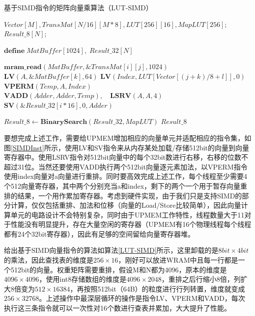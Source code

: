 \begin{algorithm}[!htbp]
    \caption{基于SIMD指令的矩阵向量乘算法（LUT-SIMD）}
    \label{LUT-SIMD}
    \begin{algorithmic}[1]
        \Require $Vector[M], TransMat[N/16][M*8], LUT[256][16], MapLUT[256]$; %
        \Ensure $Result\_8[N]$; %

        \State $\textbf{define}\;MatBuffer[1024],\;Result\_32[N]$

                \State $\textbf{mram\_read}(MatBuffer, \&TransMat[i][j], 1024)$
                    \State $\textbf{LV}(A, \&MatBuffer[k], 64)$
                        \State $\textbf{LV}(Index, LUT[Vector[(j + k) / 8 + l]], 0)$
                        \State $\textbf{VPERM}(Temp, A, Index)$
                        \State $\textbf{VADD}(Adder, Adder, Temp),\quad \textbf{LSRV}(A, A, 4)$
                    \EndFor
                \EndFor
            \EndFor
            \State $\textbf{SV}(\&Result\_32[i*16], 0, Adder)$
        \EndFor

        \State $Result\_8 \gets \textbf{BinarySearch}(Result\_32, MapLUT)$
        \Comment{\textcolor{blue}{parallel in N}}
        \State \Return $Result\_8$
    \end{algorithmic}
\end{algorithm}

要想完成上述工作，需要给UPMEM增加相应的向量单元并适配相应的指令集，如图\ref{SIMDInst}所示，使用LV和SV指令来从内存某处加载/存储512bit的向量到向量寄存器中。使用LSRV指令对512bit向量中的每个32bit数进行右移，右移的位数不超过31位。当然还要使用VADD执行两个512bit向量逐元素加法，以VPERM指令使用index向量对a向量进行重排。同时要高效完成上述工作，每个线程至少需要4个512向量寄存器，其中两个分别充当a和index，剩下的两个一个用于暂存向量重排的结果，一个用作累加寄存器。考虑到硬件实现，由于我们只是支持SIMD的部分计算，仅仅包括重排、加法和位移（向量的Load/Store比较简单），因此向量计算单元的电路设计不会特别复杂，同时由于UPMEM工作特性，线程数量大于11对于性能没有明显提升，存在大量空闲的寄存器（UPMEM有16个物理线程每个线程都有24个32bit寄存器），因此有足够的空间留给向量寄存器堆。

给出基于SIMD向量指令的算法如算法\ref{LUT-SIMD}所示，这里卸载的是$8bit\times 4bit$的乘法，因此查找表的维度是$256\times 16$，刚好可以放进WRAM中且每一行都是一个512bit的向量。权重矩阵需要重排，假设M和N都为4096，原本的维度是$4096\times 4096$，使用int8存储数组的维度是$4096\times 2048$，重排之后行缩小8倍，列扩大8倍变为$512\times 16384$，再按照512bit（64B）的粒度进行行列转置，维度就变成$256\times 32768$。上述操作中最深层循环的操作是指令LV、VPERM和VADD，每次执行这三条指令就可以一次性对16个数进行查表并累加，大大提升了性能。


